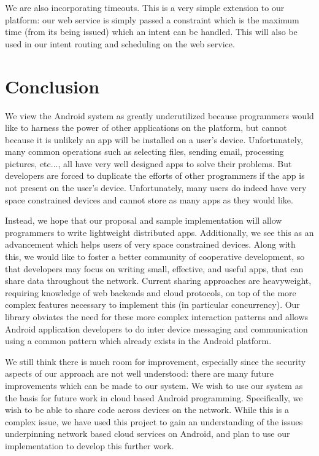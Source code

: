 \documentclass{acm_proc_article-sp}
\begin{document}
We are also incorporating timeouts.  This is a very simple extension
to our platform: our web service is simply passed a constraint which
is the maximum time (from its being issued) which an intent can be
handled.  This will also be used in our intent routing and scheduling
on the web service.

\section{Conclusion}
We view the Android system as greatly underutilized because
programmers would like to harness the power of other applications on
the platform, but cannot because it is unlikely an app will be
installed on a user's device.  Unfortunately, many common operations
such as selecting files, sending email, processing pictures, etc...,
all have very well designed apps to solve their problems.  But
developers are forced to duplicate the efforts of other programmers if
the app is not present on the user's device.  Unfortunately, many
users do indeed have very space constrained devices and cannot store
as many apps as they would like.

Instead, we hope that our proposal and sample implementation will
allow programmers to write lightweight distributed apps.
Additionally, we see this as an advancement which helps users of very
space constrained devices.  Along with this, we would like to foster a
better community of cooperative development, so that developers may
focus on writing small, effective, and useful apps, that can share
data throughout the network.  Current sharing approaches are
heavyweight, requiring knowledge of web backends and cloud protocols,
on top of the more complex features necessary to implement this (in
particular concurrency).  Our library obviates the need for these more
complex interaction patterns and allows Android application developers
to do inter device messaging and communication using a common pattern
which already exists in the Android platform.

We still think there is much room for improvement, especially since
the security aspects of our approach are not well understood: there
are many future improvements which can be made to our system.  We wish
to use our system as the basis for future work in cloud based Android
programming.  Specifically, we wish to be able to share code across
devices on the network.  While this is a complex issue, we have used
this project to gain an understanding of the issues underpinning
network based cloud services on Android, and plan to use our
implementation to develop this further work.
\end{document}
